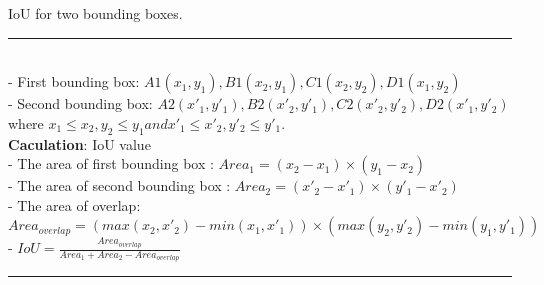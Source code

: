 \begin{algorithm}
 \caption{ IoU for two bounding boxes.}
 \label{alg:iou_alg}
\SetAlgoLined
\noindent\rule{16cm}{0.4pt}\\
- First bounding box: $A1(x_{1}, y_{1}), B1(x_{2}, y_{1}), C1(x_{2}, y_{2}), D1(x_{1}, y_{2})$\\
- Second bounding box: $A2(x'_{1}, y'_{1}), B2(x'_{2}, y'_{1}), C2(x'_{2}, y'_{2}), D2(x'_{1}, y'_{2})$\\
  where $x_{1} \leq x_{2}, y_{2} \leq y_{1} and  x'_{1} \leq x'_{2}, y'_{2} \leq y'_{1}$.\\
\textbf{Caculation}: IoU value\\
- The area of first bounding box : $Area_{1} = (x_{2} - x_{1})\times (y_{1} - x_{2})$\\
- The area of second bounding box : $Area_{2} = (x'_{2} - x'_{1})\times (y'_{1} - x'_{2})$\\
- The area of overlap: $Area_{overlap} = (max(x_{2}, x'_{2}) - min(x_{1}, x'_{1})) \times (max(y_{2}, y'_{2}) - min(y_{1}, y'_{1})) $\\
- $IoU =\frac{Area_{overlap}}{Area_{1} +  Area_{2} - Area_{overlap}}$\\
\noindent\rule{16cm}{0.4pt}
\
\end{algorithm}
